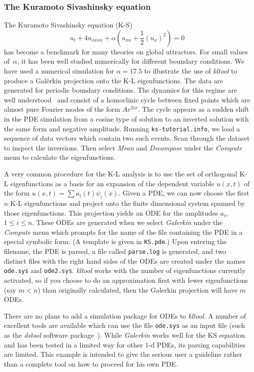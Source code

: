 \subsubsection{The Kuramoto Sivashinsky equation}
The Kuramoto Sivashinsky equation (K-S)
\begin{equation}
u_{t} + 4 u_{xxxx} + \alpha (u_{xx} + \textstyle\frac{1}{2} (u_{x})^{2}) = 0
\end{equation}
has become a benchmark for many theories on global attractors.
For small values of~$\alpha$, it has been well studied numerically for
different boundary conditions.
We have used a numerical simulation for $\alpha = 17.5$
to illustrate the use of {\sl kltool} to
produce a Gal\"{e}rkin projection onto the K-L eigenfunctions. 
The data are generated for periodic boundary conditions.
The dynamics for this regime are well understood~\cite{arm}
and consist of a homoclinic cycle between fixed points 
which are almost pure Fourier modes of the form $A e^{2 i x}$. The cycle
appears as a sudden shift in the PDE simulation from a cosine type of 
solution to an inverted solution with the same form and negative amplitude.
Running {\tt ks-tutorial.info}, we load a sequence of data vectors which
contain two such events. Scan through the dataset to inspect the inversions.
Then select {\sl Mean} and {\sl Decompose} under the {\sl Compute} menu
to calculate the eigenfunctions.

A very common procedure for the K-L analysis is to use the set of orthogonal
K-L eigenfunctions as a basis for an expansion of the
dependent variable $u(x,t)$ of the form $u(x,t) = \sum a_i(t) \psi_i(x)$.
Given a PDE, we can now choose the first $n$ K-L eigenfunctions and
project onto the finite dimensional system spanned by those eigenfunctions.
This projection yields an ODE for the amplitudes $a_i$, $1 \leq i \leq n$.
These ODEs are generated when we select {\sl Galerkin} under the 
{\sl Compute} menu
which prompts for the name of the file
containing the PDE in a special symbolic form.
(A template is given in {\tt KS.pde}.)
Upon entering the filename, the PDE is 
parsed, a file called {\tt parse.log} is generated,
and two distinct files
with the right hand sides of the ODEs are created under the names
{\tt ode.sys} and {\tt ode2.sys}.
{\sl kltool} works with the number of eigenfunctions currently
activated, so if you choose to do an approximation first with fewer
eigenfunctions (say $m < n$) than originally calculated,
then the Galerkin projection will have $m$ ODEs.

There are no plans to add a simulation package for ODEs to {\sl kltool}.
A number of excellent tools are available which
can use the file {\tt ode.sys} as an input file
(such as the {\sl dstool} software package~\cite{gu}).
While {\sl Galerkin} works well for the KS equation and has been tested in a 
limited way for other 1-d PDEs, its parsing capabilities are
limited.  This example is intended to give the serious user a 
guideline rather than a complete tool on how to proceed for his own PDE.


